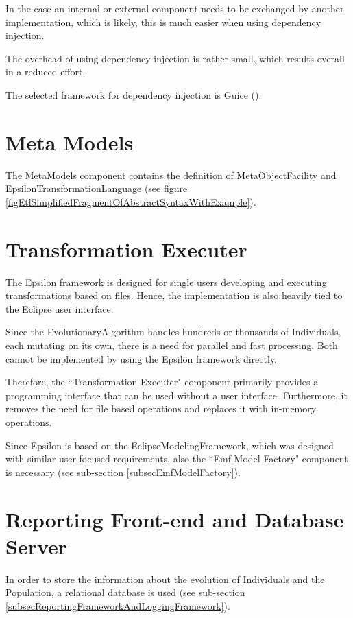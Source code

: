 In the case an internal or external component needs to be exchanged by another implementation,  which is likely, this is much easier when using dependency injection.

The overhead of using dependency injection is rather small, which results overall in a reduced effort.

The selected framework for dependency injection is Guice (\cite{Google}).

\section{Meta Models}\label{secMetaModels}

The \glspl{MetaModel} component contains the definition of \gls{MetaObjectFacility} and \gls{EpsilonTransformationLanguage} (see figure \ref{figEtlSimplifiedFragmentOfAbstractSyntaxWithExample}).

\section{Transformation Executer}\label{secTransformationExecuter}

The Epsilon framework is designed for single users developing and executing transformations based on files. Hence, the implementation is also heavily tied to the Eclipse user interface.

Since the \gls{EvolutionaryAlgorithm} handles hundreds or thousands of \glspl{Individual}, each mutating on its own, there is a need for parallel and fast processing. Both cannot be implemented by using the Epsilon framework directly. 

Therefore, the ``Transformation Executer" component primarily provides a programming interface that can be used without a user interface. Furthermore, it removes the need for file based operations and replaces it with in-memory operations. 

Since Epsilon is based on the \gls{EclipseModelingFramework}, which was designed with similar user-focused requirements, also the ``Emf Model Factory" component is necessary (see sub-section \ref{subsecEmfModelFactory}).

\section{Reporting Front-end and Database Server}\label{secFrontendAndDatabaseServer}

In order to store the information about the evolution of \glspl{Individual} and the \gls{Population}, a relational database is used (see sub-section \ref{subsecReportingFrameworkAndLoggingFramework}). 


